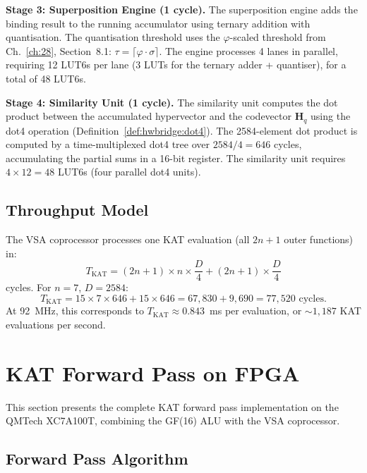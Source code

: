 \textbf{Stage 3: Superposition Engine (1 cycle).}
The superposition engine adds the binding result to the running accumulator
using ternary addition with quantisation. The quantisation threshold uses
the $\varphi$-scaled threshold from Ch.~\ref{ch:28}, Section~8.1:
$\tau = \lceil \varphi \cdot \sigma \rceil$. The engine processes 4 lanes
in parallel, requiring 12 LUT6s per lane (3 LUTs for the ternary adder +
quantiser), for a total of 48 LUT6s.

\textbf{Stage 4: Similarity Unit (1 cycle).}
The similarity unit computes the dot product between the accumulated
hypervector and the codevector $\mathbf{H}_q$ using the dot4 operation
(Definition~\ref{def:hwbridge:dot4}). The 2584-element dot product is
computed by a time-multiplexed dot4 tree over $2584/4 = 646$ cycles,
accumulating the partial sums in a 16-bit register. The similarity unit
requires $4 \times 12 = 48$ LUT6s (four parallel dot4 units).

\subsection{Throughput Model}

\begin{proposition}
\label{prop:hwbridge:vcp-throughput}
The VSA coprocessor processes one KAT evaluation (all $2n+1$ outer functions)
in:
\[
  T_{\text{KAT}} = (2n+1) \times n \times \frac{D}{4} + (2n+1) \times \frac{D}{4}
\]
cycles. For $n = 7$, $D = 2584$:
\[
  T_{\text{KAT}} = 15 \times 7 \times 646 + 15 \times 646 = 67{,}830 + 9{,}690 = 77{,}520 \text{ cycles}.
\]
At 92~MHz, this corresponds to $T_{\text{KAT}} \approx 0.843$~ms per evaluation,
or $\sim 1{,}187$ KAT evaluations per second.
\end{proposition}

\section{KAT Forward Pass on FPGA}
\label{sec:hwbridge:forward-pass}

This section presents the complete KAT forward pass implementation on the
QMTech XC7A100T, combining the GF(16) ALU with the VSA coprocessor.

\subsection{Forward Pass Algorithm}

